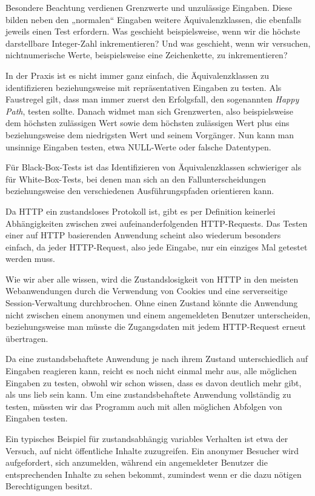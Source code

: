 Besondere Beachtung verdienen Grenzwerte und unzulässige Eingaben. Diese bilden neben
den „normalen“ Eingaben weitere Äquivalenzklassen, die ebenfalls jeweils einen Test
erfordern. Was geschieht beispielsweise, wenn wir die höchste darstellbare Integer-Zahl 
inkrementieren? Und was geschieht, wenn wir versuchen, nichtnumerische Werte, beispielsweise
eine Zeichenkette, zu inkrementieren?

In der Praxis ist es nicht immer ganz einfach, die Äquivalenzklassen zu identifizieren 
beziehungsweise mit repräsentativen Eingaben zu testen. Als Faustregel gilt, dass man immer
zuerst den Erfolgsfall, den sogenannten \textit{Happy Path}, testen sollte. Danach widmet man
sich Grenzwerten, also beispielsweise dem höchsten zulässigen Wert sowie dem höchsten
zulässigen Wert plus eins beziehungsweise dem niedrigsten Wert und seinem Vorgänger.
Nun kann man unsinnige Eingaben testen, etwa NULL-Werte oder falsche Datentypen.

Für Black-Box-Tests ist das Identifizieren von Äquivalenzklassen schwieriger als für White-Box-Tests,
bei denen man sich an den Fallunterscheidungen beziehungsweise den verschiedenen Ausführungspfaden orientieren kann.

Da HTTP ein zustandsloses Protokoll ist, gibt es per Definition keinerlei Abhängigkeiten
zwischen zwei aufeinanderfolgenden HTTP-Requests. Das Testen einer auf HTTP basierenden 
Anwendung scheint also wiederum besonders einfach, da jeder HTTP-Request, also jede Eingabe,
nur ein einziges Mal getestet werden muss.

Wie wir aber alle wissen, wird die Zustandslosigkeit von HTTP in den meisten Webanwendungen
durch die Verwendung von Cookies und eine serverseitige Session-Verwaltung durchbrochen. 
Ohne einen Zustand könnte die Anwendung nicht zwischen einem anonymen und einem angemeldeten
Benutzer unterscheiden, beziehungsweise man müsste die Zugangsdaten mit jedem HTTP-Request erneut übertragen.

Da eine zustandsbehaftete Anwendung je nach ihrem Zustand unterschiedlich auf Eingaben reagieren kann,
reicht es noch nicht einmal mehr aus, alle möglichen Eingaben zu testen, obwohl wir schon wissen, 
dass es davon deutlich mehr gibt, als uns lieb sein kann. Um eine zustandsbehaftete Anwendung
vollständig zu testen, müssten wir das Programm auch mit allen möglichen Abfolgen von Eingaben testen.

Ein typisches Beispiel für zustandsabhängig variables Verhalten ist etwa der Versuch, auf
nicht öffentliche Inhalte zuzugreifen. Ein anonymer Besucher wird aufgefordert, sich anzumelden,
während ein angemeldeter Benutzer die entsprechenden Inhalte zu sehen bekommt, zumindest wenn er
die dazu nötigen Berechtigungen besitzt. 

